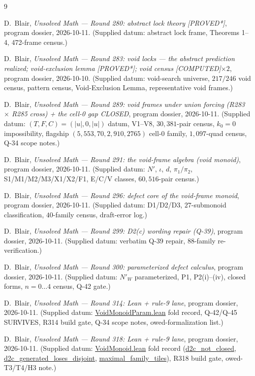 \documentclass[11pt,a4paper]{article}
\theoremstyle{definition}
\begin{document}
\begin{thebibliography}{9}

D.~Blair,
\emph{Unsolved Math --- Round 280: abstract lock theory [PROVED*]},
program dossier, 2026-10-11.
(Supplied datum: abstract lock frame, Theorems 1--4, 472-frame census.)

D.~Blair,
\emph{Unsolved Math --- Round 283: void locks --- the abstract prediction
realized; void-exclusion lemma [PROVED*]; void census [COMPUTED]$\times2$},
program dossier, 2026-10-10.
(Supplied datum: void-search universe, $217/246$ void census,
pattern census, Void-Exclusion Lemma, representative void frames.)

D.~Blair,
\emph{Unsolved Math --- Round 289: void frames under union forcing
(R283 $\times$ R285 cross) + the cell-0 gap CLOSED},
program dossier, 2026-10-11.
(Supplied datum: $(T,F,C)=(|u|,0,|u|)$ datum, V1--V8, $30{,}381$-pair
census, $k_0=0$ impossibility, flagship $(5,553,70,2,910,2765)$
cell-0 family, $1{,}097$-quad census, Q-34 scope notes.)

D.~Blair,
\emph{Unsolved Math --- Round 291: the void-frame algebra (void monoid)},
program dossier, 2026-10-11.
(Supplied datum: $N'$, $\iota$, $d$, $\pi_1/\pi_2$, S1/M1/M2/M3/X1/X2/F1,
E/C/V classes, $60{,}516$-pair census.)

D.~Blair,
\emph{Unsolved Math --- Round 296: defect core of the void-frame monoid},
program dossier, 2026-10-11.
(Supplied datum: D1/D2/D3, $27$-submonoid classification, $40$-family
census, draft-error log.)

D.~Blair,
\emph{Unsolved Math --- Round 299: D2(c) wording repair (Q-39)},
program dossier, 2026-10-11.
(Supplied datum: verbatim Q-39 repair, $88$-family re-verification.)

D.~Blair,
\emph{Unsolved Math --- Round 300: parameterized defect calculus},
program dossier, 2026-10-11.
(Supplied datum: $N'_W$ parameterized, P1, P2(i)--(iv), closed forms,
$n=0\ldots4$ census, Q-42 gate.)

D.~Blair,
\emph{Unsolved Math --- Round 314: Lean + rule-9 lane},
program dossier, 2026-10-11.
(Supplied datum: \url{VoidMonoidParam.lean} fold record, Q-42/Q-45
SURVIVES, R314 build gate, Q-34 scope notes, owed-formalization list.)

D.~Blair,
\emph{Unsolved Math --- Round 318: Lean + rule-9 lane},
program dossier, 2026-10-11.
(Supplied datum: \url{VoidMonoid.lean} fold record
(\url{d2c_not_closed}, \url{d2c_generated_loses_disjoint},
\url{maximal_family_tiles}), R318 build gate, owed-T3/T4/H3 note.)


\end{thebibliography}
\end{document}
